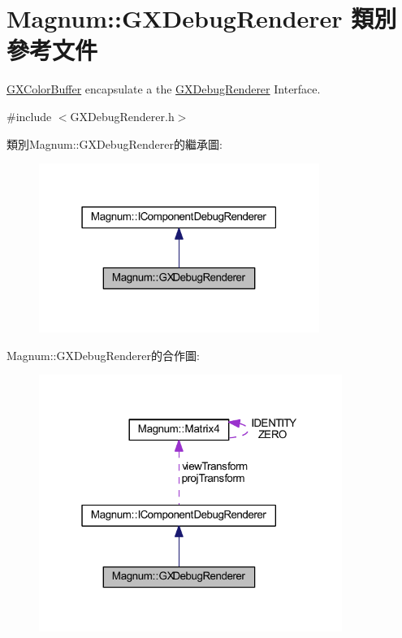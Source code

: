\hypertarget{class_magnum_1_1_g_x_debug_renderer}{}\section{Magnum\+:\+:G\+X\+Debug\+Renderer 類別 參考文件}
\label{class_magnum_1_1_g_x_debug_renderer}


\hyperlink{class_magnum_1_1_g_x_color_buffer}{G\+X\+Color\+Buffer} encapsulate a the \hyperlink{class_magnum_1_1_g_x_debug_renderer}{G\+X\+Debug\+Renderer} Interface.  




{\ttfamily \#include $<$G\+X\+Debug\+Renderer.\+h$>$}



類別\+Magnum\+:\+:G\+X\+Debug\+Renderer的繼承圖\+:\nopagebreak
\begin{figure}[H]
\begin{center}
\leavevmode
\includegraphics[width=259pt]{class_magnum_1_1_g_x_debug_renderer__inherit__graph}
\end{center}
\end{figure}


Magnum\+:\+:G\+X\+Debug\+Renderer的合作圖\+:\nopagebreak
\begin{figure}[H]
\begin{center}
\leavevmode
\includegraphics[width=280pt]{class_magnum_1_1_g_x_debug_renderer__coll__graph}
\end{center}
\end{figure}
